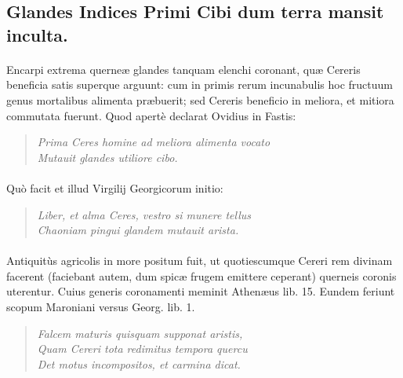 \documentclass[a4paper, 11pt, oneside, polutonikogreek, latin]{article}
\begin{document}
\subsection{Glandes Indices Primi Cibi dum terra mansit inculta.}
\paragraph{}
Encarpi extrema querneæ glandes tanquam elenchi coronant, quæ Cereris beneficia satis superque arguunt: cum in primis rerum incunabulis hoc fructuum genus mortalibus alimenta præbuerit; sed Cereris beneficio in meliora, et mitiora commutata fuerunt. Quod apertè declarat Ovidius in Fastis:
\begin{quote}
\emph{Prima Ceres homine ad meliora alimenta vocato}\\
\hspace*{10mm}\emph{Mutauit glandes utiliore cibo.}\\
\end{quote}
\paragraph{}
Quò facit et illud Virgilij Georgicorum initio:
\begin{quote}
\emph{Liber, et alma Ceres, vestro si munere tellus}\\
\emph{Chaoniam pingui glandem mutauit arista.}\\
\end{quote}
\paragraph{}
Antiquitùs agricolis in more positum fuit, ut quotiescumque Cereri rem divinam facerent (faciebant autem, dum spicæ frugem emittere ceperant) querneis coronis uterentur. Cuius generis coronamenti meminit Athenæus lib. 15. Eundem feriunt scopum Maroniani versus Georg. lib. 1.
\begin{quote}
\emph{Falcem maturis quisquam supponat aristis,}\\
\emph{Quam Cereri tota redimitus tempora quercu}\\
\emph{Det motus incompositos, et carmina dicat.}\\
\end{quote}
\end{document}
